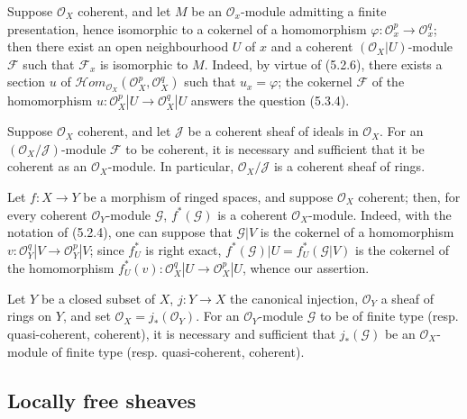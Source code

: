 \begin{env}[5.3.9]
\label{0.5.3.9}
Suppose $\mathcal{O}_X$ coherent, and let $M$ be an $\mathcal{O}_x$-module
admitting a finite presentation, hence isomorphic to a cokernel of a
homomorphism $\varphi:\mathcal{O}_x^p\to\mathcal{O}_x^q$; then there exist an
open neighbourhood $U$ of $x$ and a coherent $(\mathcal{O}_X|U)$-module
$\mathcal{F}$ such that $\mathcal{F}_x$ is isomorphic to $M$. Indeed, by virtue
of (5.2.6), there exists a section $u$ of
$\mathcal{H}\!om_{\mathcal{O}_X}(\mathcal{O}_X^p,\mathcal{O}_X^q)$ such that $u_x=\varphi$; the cokernel
$\mathcal{F}$ of the homomorphism
$u:\mathcal{O}_X^p|U\to\mathcal{O}_X^q|U$ answers the question (5.3.4).
\end{env}

\begin{env}[5.3.10]
\label{0.5.3.10}
Suppose $\mathcal{O}_X$ coherent, and let $\mathcal{J}$ be a coherent sheaf
of ideals in $\mathcal{O}_X$. For an
$(\mathcal{O}_X/\mathcal{J})$-module $\mathcal{F}$ to be coherent, it is necessary and
sufficient that it be coherent as an $\mathcal{O}_X$-module. In particular,
$\mathcal{O}_X/\mathcal{J}$ is a coherent sheaf of rings.
\end{env}

\begin{env}[5.3.11]
\label{0.5.3.11}
Let $f:X\to Y$ be a morphism of ringed spaces, and suppose
$\mathcal{O}_X$ coherent; then, for every coherent $\mathcal{O}_Y$-module
$\mathcal{G}$, $f^*(\mathcal{G})$ is a coherent $\mathcal{O}_X$-module.
Indeed, with the notation of (5.2.4), one can suppose that $\mathcal{G}|V$ is
the cokernel of a homomorphism
$v:\mathcal{O}_Y^q|V\to\mathcal{O}_Y^p|V$; since $f_U^*$ is right exact,
$f^*(\mathcal{G})|U=f_U^*(\mathcal{G}|V)$ is the cokernel of the homomorphism
$f_U^*(v):\mathcal{O}_X^q|U\to\mathcal{O}_X^p|U$, whence our assertion.
\end{env}

\begin{env}[5.3.12]
\label{0.5.3.12}
Let $Y$ be a closed subset of $X$, $j:Y\to X$ the canonical injection,
$\mathcal{O}_Y$ a sheaf of rings on $Y$, and set
$\mathcal{O}_X=j_*(\mathcal{O}_Y)$. For an $\mathcal{O}_Y$-module
$\mathcal{G}$ to be of finite type (resp. quasi-coherent, coherent), it is necessary and
sufficient that $j_*(\mathcal{G})$ be an $\mathcal{O}_X$-module of finite type
(resp. quasi-coherent, coherent).
\end{env}

\subsection{Locally free sheaves}
\label{subsection:0.5.4}


